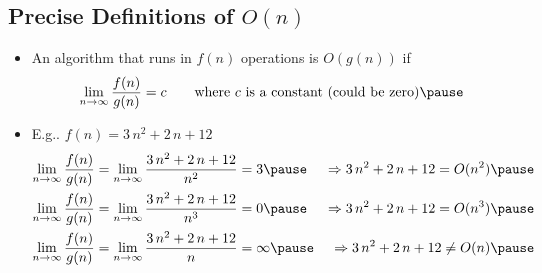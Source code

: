 \begin{slide}
\section[-2]{Precise Definitions of $O(n)$}

\begin{PauseHighLight}
  \begin{itemize}
  \item An algorithm that runs in $f(n)$ operations is $O(g(n))$ if
    \begin{displaymath}
      \lim_{n\rightarrow\infty} \frac{f(n)}{g(n)} = c \qquad
      \mbox{where $c$ is a constant (could be zero)}\pause
    \end{displaymath}
  \item E.g.. $f(n)=3\,n^2 + 2\,n + 12$
    \begin{align*}
      \lim_{n\rightarrow\infty} \frac{f(n)}{g(n)} &=
      \lim_{n\rightarrow\infty} \frac{3\,n^2 + 2\,n + 12}{n^2} = 3\pause &
      \Rightarrow 3\,n^2 + 2\,n + 12 = O(n^2)\pause\\
      \lim_{n\rightarrow\infty} \frac{f(n)}{g(n)} &=
      \lim_{n\rightarrow\infty} \frac{3\,n^2 + 2\,n + 12}{n^3} = 0\pause
      &
      \Rightarrow 3\,n^2 + 2\,n + 12 = O(n^3)\pause\\
      \lim_{n\rightarrow\infty} \frac{f(n)}{g(n)} &=
      \lim_{n\rightarrow\infty} \frac{3\,n^2 + 2\,n + 12}{n} =
      \infty\pause &
      \Rightarrow 3\,n^2 + 2\,n + 12 \neq O(n)\pause
    \end{align*}
  \end{itemize}
\end{PauseHighLight}
\end{slide}


